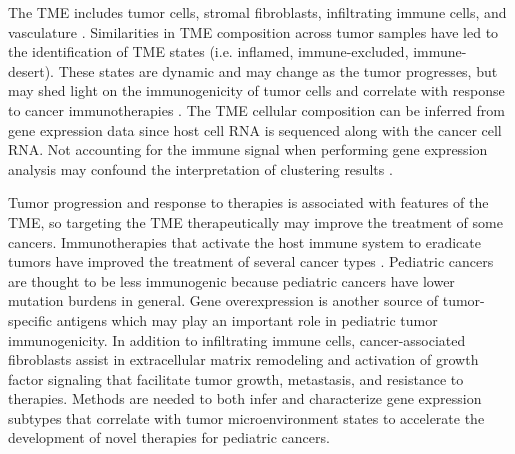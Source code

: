 \documentclass[10pt,letterpaper]{article}
\begin{document}
The TME includes tumor cells, stromal fibroblasts, infiltrating immune cells, and vasculature \cite{joyceCellExclusionImmune2015}. Similarities in TME composition across tumor samples have led to the identification of TME states (i.e. inflamed, immune-excluded, immune-desert). These states are dynamic and may change as the tumor progresses, but may shed light on the immunogenicity of tumor cells and correlate with response to cancer immunotherapies \cite{chenElementsCancerImmunity2017}. The TME cellular composition can be inferred from gene expression data since host cell RNA is sequenced along with the cancer cell RNA. Not accounting for the immune signal when performing gene expression analysis may confound the interpretation of clustering results \cite{aranXCellDigitallyPortraying2017, rheeImpactTumorPurity2018, hoadleyCellofOriginPatternsDominate2018}.

Tumor progression and response to therapies is associated with features of the TME, so targeting the TME therapeutically may improve the treatment of some cancers. Immunotherapies that activate the host immune system to eradicate tumors have improved the treatment of several cancer types \cite{mellmanCancerImmunotherapyComes2011, pageImmuneModulationCancer2014}. Pediatric cancers are thought to be less immunogenic because pediatric cancers have lower mutation burdens in general. Gene overexpression is another source of tumor-specific antigens which may play an important role in pediatric tumor immunogenicity. In addition to infiltrating immune cells, cancer-associated fibroblasts assist in extracellular matrix remodeling and activation of growth factor signaling that facilitate tumor growth, metastasis, and resistance to therapies. Methods are needed to both infer and characterize gene expression subtypes that correlate with tumor microenvironment states to accelerate the development of novel therapies for pediatric cancers.
 
\end{document}
